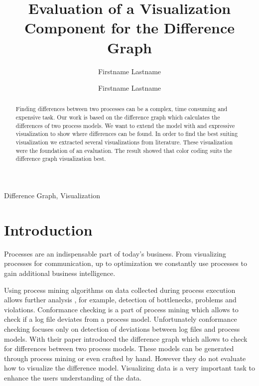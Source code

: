 \documentclass{llncs}
\begin{document}
\title{Evaluation of a Visualization Component for the Difference Graph}
\author{Firstname Lastname \and Firstname Lastname}
\maketitle
\begin{abstract}
Finding differences between two processes can be a complex, time consuming and expensive task. Our work is based on the difference graph which calculates the differences of two process models. We want to extend the model with and expressive visualization to show where differences can be found. In order to find the best suiting visualization we extracted several visualizations from literature. These visualization were the foundation of an evaluation. The result showed that color coding suits the difference graph visualization best.
\end{abstract}

\begin{keywords}
	Difference Graph, Visualization
\end{keywords}



\section{Introduction}
\label{sec:Introduction} %

Processes are an indispensable part of today’s business. From visualizing processes for communication, up to optimization we constantly use processes to gain additional business intelligence.

Using process mining algorithms on data collected during process execution allows further analysis \cite{lit:PMDiscoveryConformanceEnhancement}, for example, detection of bottlenecks, problems and violations. Conformance checking \cite{lit:ConformanceCheckingOfProcesses} is a part of process mining which allows to check if a log file deviates from a process model. Unfortunately conformance checking focuses only on detection of deviations between log files and process models. With their paper \cite{lit:VisuApprDiffAnalysis} introduced the difference graph which allows to check for differences between two process models. These models can be generated through process mining or even crafted by hand. 
However they do not evaluate how to visualize the difference model. Visualizing data is a very important task to enhance the users understanding of the data. 
\end{document}
